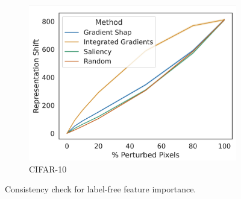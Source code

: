 \begin{figure}
\begin{subfigure}[b]{0.3\textwidth}
         \centering
         \includegraphics[width=\textwidth]{images/feature_consistency_cifar.png}
         \caption{CIFAR-10}
         \label{fig:feature_consistency_cifar}
     \end{subfigure}
        \caption{Consistency check for label-free feature importance.}
        \label{fig:feature_consistency.png}
\end{figure}



